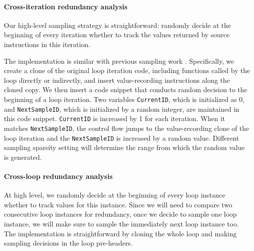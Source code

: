 
\paragraph{Cross-iteration redundancy analysis}
Our high-level sampling strategy is straightforward:
randomly decide at the
beginning of every iteration whether to track the values returned by
source instructions in this iteration.

The implementation is similar with previous sampling work 
\cite{liblit03,liblit05}.
Specifically, we create a clone of the original
loop iteration code, including functions called by the loop directly or
indirectly, and insert value-recording instructions along the
cloned copy. 
We then insert a code snippet that conducts random decision to
the beginning of a loop iteration. 
Two variables \texttt{CurrentID}, which is initialized as 0, 
and \texttt{NextSampleID}, which is initialized by a random integer, 
are maintained
in this code snippet. \texttt{CurrentID} is increased by 1
for each iteration. When it matches \texttt{NextSampleID}, the control
flow jumps to the value-recording clone of the loop iteration and the 
\texttt{NextSampleID} is increased by a random value. Different sampling
sparsity setting will determine the range from which the random value is
generated.


\paragraph{Cross-loop redundancy analysis} 
At high level, we randomly decide at the beginning
of every loop instance whether to track values for this instance. 
Since we will need to compare two consecutive loop
instances for redundancy, once we decide to sample one loop instance, we will
make sure to sample the immediately next loop instance too.
The implementation is straightforward by cloning the whole loop and making
sampling decisions in the loop pre-headers.

